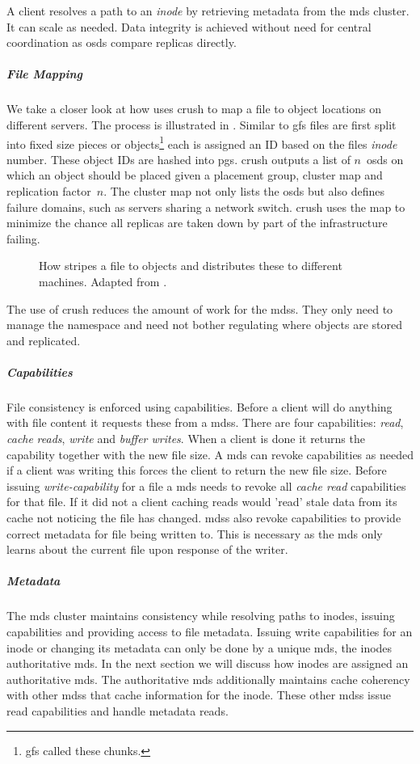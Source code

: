 A client resolves a path to an \textit{inode} by retrieving metadata from the \ac{mds} cluster. It can scale as needed. Data integrity is achieved without need for central coordination as \acp{osd} compare replicas directly. 
%
\subparagraph{File Mapping}
We take a closer look at how \ceph{} uses \ac{crush} to map a file to object locations on different servers. The process is illustrated in . Similar to \ac{gfs} files are first split into fixed size pieces or objects\footnote{\ac{gfs} called these chunks.} each is assigned an ID based on the files \textit{inode} number. These object IDs are hashed into \acp{pg}. \ac{crush} outputs a list of $n$~\acp{osd} on which an object should be placed given a placement group, cluster map and replication factor~$n$. The cluster map not only lists the \acp{osd} but also defines failure domains, such as servers sharing a network switch. \ac{crush} uses the map to minimize the chance all replicas are taken down by part of the infrastructure failing.

\begin{figure}[htbp]
	\centering
	
	\caption{How \ceph{} stripes a file to objects and distributes these to different machines. Adapted from \cite{ceph}.}
	\label{fig:ceph_crush}
\end{figure}

The use of \ac{crush} reduces the amount of work for the \acp{mds}. They only need to manage the namespace and need not bother regulating where objects are stored and replicated.
%
\subparagraph{Capabilities}
File consistency is enforced using capabilities. Before a client will do anything with file content it requests these from a \acp{mds}. There are four capabilities: \textit{read}, \textit{cache} \textit{reads}, \textit{write} and \textit{buffer writes}. When a client is done it returns the capability together with the new file size. A \ac{mds} can revoke capabilities as needed if a client was writing this forces the client to return the new file size. Before issuing \textit{write-capability} for a file a \ac{mds} needs to revoke all \textit{cache read} capabilities for that file. If it did not a client caching reads would 'read' stale data from its cache not noticing the file has changed. \acp{mds} also revoke capabilities to provide correct metadata for file being written to. This is necessary as the \ac{mds} only learns about the current file upon response of the writer.
%
\subparagraph{Metadata}
The \ac{mds} cluster maintains consistency while resolving paths to inodes, issuing capabilities and providing access to file metadata. Issuing write capabilities for an inode or changing its metadata can only be done  by a unique \ac{mds}, the inodes authoritative \ac{mds}. In the next section we will discuss how inodes are assigned an authoritative \ac{mds}. The authoritative \ac{mds} additionally maintains cache coherency with other \acp{mds} that cache information for the inode. These other \acp{mds} issue read capabilities and handle metadata reads.


